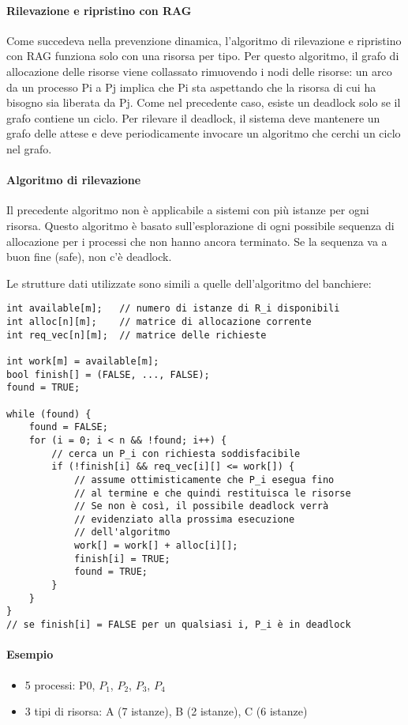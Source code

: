 \documentclass[a4]{article}
\begin{document}
\paragraph{Rilevazione e ripristino con RAG}
Come succedeva nella prevenzione dinamica, l'algoritmo di rilevazione e ripristino con RAG funziona solo con una risorsa per tipo. Per questo algoritmo, il grafo di allocazione delle risorse viene collassato rimuovendo i nodi delle risorse: un arco da un processo Pi a Pj implica che Pi sta aspettando che la risorsa di cui ha bisogno sia liberata da Pj. Come nel precedente caso, esiste un deadlock solo se il grafo contiene un ciclo. Per rilevare il deadlock, il sistema deve mantenere un grafo delle attese e deve periodicamente invocare un algoritmo che cerchi un ciclo nel grafo.

\paragraph{Algoritmo di rilevazione} Il precedente algoritmo non è applicabile a sistemi con più istanze per ogni risorsa. Questo algoritmo è basato sull'esplorazione di ogni possibile sequenza di allocazione per i processi che non hanno ancora terminato. Se la sequenza va a buon fine (safe), non c'è deadlock.

Le strutture dati utilizzate sono simili a quelle dell'algoritmo del banchiere:
\begin{Verbatim}[tabsize=3]
int available[m];   // numero di istanze di R_i disponibili
int alloc[n][m];    // matrice di allocazione corrente
int req_vec[n][m];  // matrice delle richieste

int work[m] = available[m];
bool finish[] = (FALSE, ..., FALSE);
found = TRUE;

while (found) {
    found = FALSE;
    for (i = 0; i < n && !found; i++) {
        // cerca un P_i con richiesta soddisfacibile
        if (!finish[i] && req_vec[i][] <= work[]) {
            // assume ottimisticamente che P_i esegua fino
            // al termine e che quindi restituisca le risorse
            // Se non è così, il possibile deadlock verrà
            // evidenziato alla prossima esecuzione
            // dell'algoritmo
            work[] = work[] + alloc[i][];
            finish[i] = TRUE;
            found = TRUE;
        }
    }
} 
// se finish[i] = FALSE per un qualsiasi i, P_i è in deadlock
\end{Verbatim}

\paragraph{Esempio}
\begin{itemize}
    \item 5 processi: P0, $P_1$, $P_2$, $P_3$, $P_4$
    \item 3 tipi di risorsa: A (7 istanze), B (2 istanze), C (6 istanze)
\end{itemize}
\end{document}
